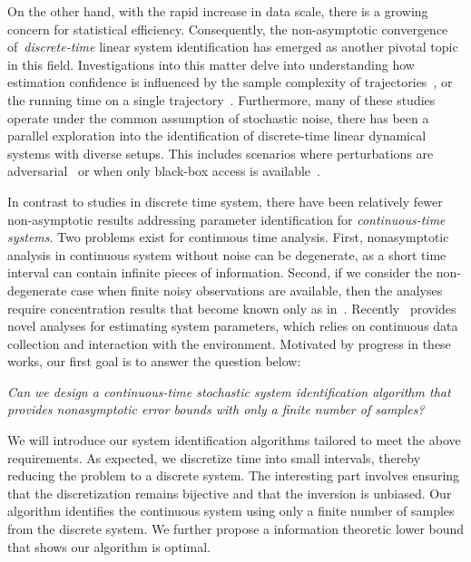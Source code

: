 \documentclass{article}
\theoremstyle{definition}
\begin{document}
On the other hand, with the rapid increase in data scale, there is a growing concern for statistical efficiency. Consequently, the non-asymptotic convergence of~\emph{discrete-time} linear system identification has emerged as another pivotal topic in this field. Investigations into this matter delve into understanding how estimation confidence is influenced by the sample complexity of trajectories~\citep{ref5}, or the running time on a single trajectory~\citep{ref4,ref23}. Furthermore, many of these studies operate under the common assumption of stochastic noise, there has been a parallel exploration into the identification of discrete-time linear dynamical systems with diverse setups. This includes scenarios where perturbations are adversarial~\citep{hazan2020nonstochastic} or when only black-box access is available~\citep{ref28}.

In contrast to studies in discrete time system, there have been relatively fewer non-asymptotic results addressing parameter identification for \emph{continuous-time systems}. Two problems exist for continuous time analysis. First, nonasymptotic analysis in continuous system without noise can be degenerate, as a short time interval can contain infinite pieces of information. Second, if we consider the non-degenerate case when finite noisy observations are available, then the analyses require concentration results that become known only as in~\citep{ref4,ref5,ref23}. Recently~\cite{ref3} provides novel analyses for estimating  system parameters, which relies on continuous data collection and
interaction with the environment. 
Motivated by progress in these works, our first goal is to answer the question below: 

\begin{center}
\emph{Can we design a continuous-time stochastic system identification algorithm that provides nonasymptotic error bounds with only a finite number of samples?}
\end{center}

We will introduce our system identification algorithms tailored to meet the above requirements. As expected, we discretize time into small intervals, thereby reducing the problem to a discrete system. The interesting part involves ensuring that the discretization remains bijective and that the inversion is unbiased. Our algorithm identifies the continuous system using only a finite number of samples from the discrete system. We further propose a information theoretic lower bound that shows our algorithm is optimal. 
\end{document}
